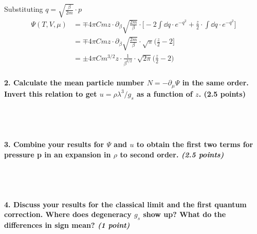     Substituting $q=\sqrt{\frac{\beta}{2m}}\cdot p$
    \begin{align}
        \Psi(T,V,\mu)
        &=\mp 4\pi Cmz\cdot\partial_\beta
            \sqrt{\frac{2m}{\beta}}\cdot\bigg[
            -2\int \dd q\cdot
                e^{-q^2}
            +\frac{z}{2}\cdot\int \dd q\cdot
                e^{-q^2}
        \bigg] \\
        &=\mp 4\pi Cmz\cdot\partial_\beta
        \sqrt{\frac{2m}{\beta}}\cdot\sqrt{\pi}\bigg(
            \frac{z}{2}-2
        \bigg] \\
        &=\pm 4\pi Cm^{3/2}z\cdot
        \frac{1}{\beta^{3/2}}\cdot\sqrt{2\pi}\bigg(
            \frac{z}{2}-2
        \bigg)
    \end{align}

\paragraph{2. Calculate the mean particle number 
    $N =-\partial_\mu\Psi$ in the same order. Invert this 
    relation to get $u=\rho\lambda^3/g_s$ as a function of $z$. 
    (2.5 points)
} \ \\
    \\

\paragraph{3. Combine your results for $\Psi$ and $u$ to obtain 
    the first two terms for pressure p in an expansion in 
    $\rho$ to second order. \textit{(2.5 points)}
} \ \\
    \\

\paragraph{4. Discuss your results for the classical limit and 
    the first quantum correction. Where does degeneracy $g_s$
    show up? What do the differences in sign mean?
    \textit{(1 point)}
} \ \\
    \\
